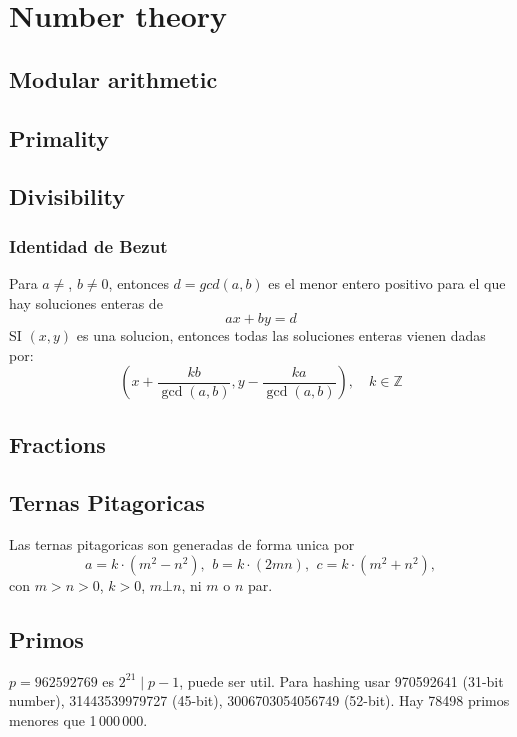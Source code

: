 \chapter{Number theory}

\section{Modular arithmetic}

\section{Primality}

\section{Divisibility}

	\subsection{Identidad de Bezut}
	Para $a \neq $, $b \neq 0$, entonces $d=gcd(a,b)$ es el menor entero positivo para el que hay soluciones enteras de
	$$ax+by=d$$
	SI $(x,y)$ es una solucion, entonces todas las soluciones enteras vienen dadas por:
	$$\left(x+\frac{kb}{\gcd(a,b)}, y-\frac{ka}{\gcd(a,b)}\right), \quad k\in\mathbb{Z}$$

\section{Fractions}

\section{Ternas Pitagoricas}
 Las ternas pitagoricas son generadas de forma unica por
 \[ a=k\cdot (m^{2}-n^{2}),\ \,b=k\cdot (2mn),\ \,c=k\cdot (m^{2}+n^{2}), \]
 con $m > n > 0$, $k > 0$, $m \bot n$, ni $m$ o $n$ par.

\section{Primos}
	$p=962592769$ es $2^{21} \mid p-1$, puede ser util. Para hashing
	usar 970592641 (31-bit number), 31443539979727 (45-bit), 3006703054056749
	(52-bit). Hay  78498 primos menores que 1\,000\,000.

